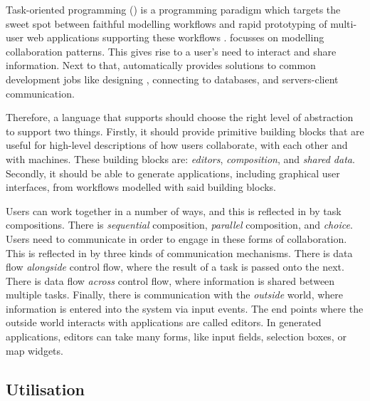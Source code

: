 Task-oriented programming (\TOP) is a programming paradigm which targets the sweet spot between faithful modelling workflows
and rapid prototyping of multi-user web applications supporting these workflows \cite{conf/ppdp/PlasmeijerLMAK12}.
\TOP focusses on modelling collaboration patterns.
This gives rise to a user's need to interact and share information.
Next to that, \TOP automatically provides solutions to common development jobs like designing , connecting to databases, and servers-client communication.

Therefore,
a language that supports \TOP should choose the right level of abstraction to support two things.
Firstly, it should provide primitive building blocks that are useful for high-level descriptions of how users collaborate,
with each other and with machines.
These building blocks are: \emph{editors}, \emph{composition}, and \emph{shared data}.
Secondly, it should be able to generate applications, including graphical user interfaces, from workflows modelled with said building blocks.

Users can work together in a number of ways, and this is reflected in \TOP by task compositions.
There is \emph{sequential} composition, \emph{parallel} composition, and \emph{choice}.
Users need to communicate in order to engage in these forms of collaboration.
This is reflected in \TOP by three kinds of communication mechanisms.
There is data flow \emph{alongside} control flow, where the result of a task is passed onto the next.
There is data flow \emph{across} control flow, where information is shared between multiple tasks.
Finally, there is communication with the \emph{outside} world, where information is entered into the system via input events.
The end points where the outside world interacts with \TOP applications are called editors.
In generated applications, editors can take many forms, like input fields, selection boxes, or map widgets.



\subsection{Utilisation}


